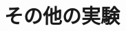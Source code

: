 \renewcommand{\prechaptername}{付録}
\renewcommand{\postchaptername}{}
\renewcommand{\thechapter}{\Alph{chapter}}

\chapter{その他の実験}